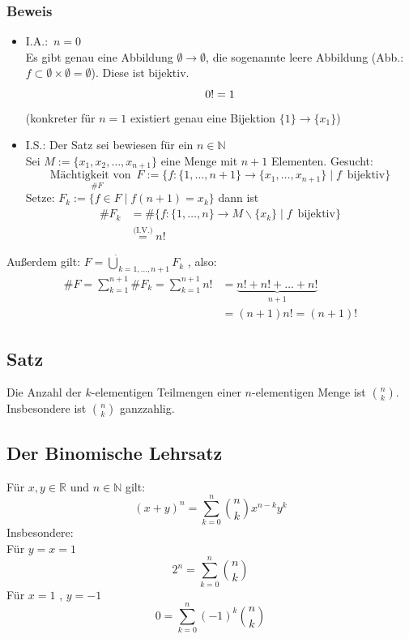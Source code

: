 \subsubsection{Beweis}
\begin{itemize}
 \item \(\text{I.A.:} \enspace n=0\) \\
Es gibt genau eine Abbildung \( \emptyset \rightarrow \emptyset \), die sogenannte \grqq leere Abbildung\grqq 
(Abb.: \( f \subset \emptyset \times \emptyset = \emptyset \)). Diese ist bijektiv. 
\[
0! = 1 \\
\]
(konkreter für \( n=1\) existiert genau eine Bijektion \( \{1\} \longrightarrow \{x_1\} \))
\item I.S.: Der Satz sei bewiesen für ein \( n \in \mathbb{N}\) \\
Sei \(M:=\{x_1, x_2, \ldots, x_{n+1}\} \) eine Menge mit \(n+1\) Elementen. Gesucht:
\[
\underset{\# F}{\text{Mächtigkeit von} \enspace F}:=\Big\{f:\{1, \ldots, n+1\} \rightarrow \{ x_1, \ldots, x_{n+1}\} \mid f \enspace \text{bijektiv} \Big\}
\]
Setze: \( F_k := \{ f \in F \mid f(n+1)=x_k\}\) dann ist
\begin{align*}
\# F_k &= \# \bigg\{ f : \{1, \ldots, n\} \rightarrow M \backslash \{x_k\} \mid f \enspace \text{bijektiv} \bigg\} \\
&\overset{\text{(I.V.)}}{=} n!
\end{align*}
\end{itemize}
Außerdem gilt: \( F = \underset{k=1, \ldots, n+1}{\dot\bigcup} F_k\) , also:
\begin{align*}
\# F = \sum \limits_{k=1}^{n+1} \# F_k = \sum \limits_{k=1}^{n+1} n! &= \underbrace{n! + n! + \ldots + n!}_{n+1} \\
&= (n+1) n! = (n+1)!
\end{align*}

\subsection{Satz}
Die Anzahl der \(k\)-elementigen Teilmengen einer \(n\)-elementigen Menge ist \(\binom{n}{k}\). \\ Insbesondere ist \(\binom{n}{k}\) ganzzahlig.

\subsection{Der Binomische Lehrsatz}
Für \( x,y \in \mathbb{R}\) und \(n \in \mathbb{N}\) gilt:
\[
\boxed{(x+y)^n = \sum \limits_{k=0}^{n} \binom{n}{k} x^{n-k} y^k}
\]
Insbesondere: \\ Für \(y=x=1\) 
\[
2^n = \sum \limits_{k=0}^{n} \binom{n}{k} 
\]
Für \(x=1\) , \(y=-1\)
\[
0= \sum \limits_{k=0}^{n} (-1)^k \binom{n}{k} 
\]

